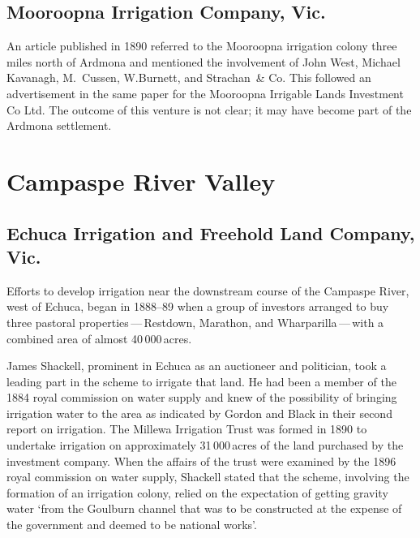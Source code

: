 \subsection*{Mooroopna Irrigation Company, Vic.}

An article published in 1890 referred to the Mooroopna irrigation
colony three miles north of Ardmona and mentioned the involvement of
John West, Mich\-ael Kavanagh, M.~Cussen, W.Burnett, and Strachan~\&
Co.  This followed an advertisement in the same paper for the
Mooroopna Irrigable Lands Investment Co Ltd. The outcome of this
venture is not clear; it may have become part of the Ardmona
settlement.

\section*{Campaspe River Valley}

\subsection*{Echuca Irrigation and Freehold Land Company, Vic.}

Efforts to develop irrigation near the downstream course of the
Campaspe River, west of Echuca, began in 1888--89 when a group of
investors arranged to buy three pastoral properties\,---\,Restdown,
Mara\-thon, and Wharparilla\,---\,with a combined area of almost
40\,000\,acres.

James Shackell, prominent in Echuca as an auctioneer and politician,
took a leading part in the scheme to irrigate that land.  He had been
a member of the 1884 royal commission on water supply and knew of the
possibility of bringing irrigation water to the area as indicated by
Gordon and Black in their second report on irrigation.  The Millewa
Irrigation Trust was formed in 1890 to undertake irrigation on
approximately 31\,000\,acres of the land purchased by the investment
company.  When the affairs of the trust were examined by the 1896
royal commission on water supply, Shackell stated that the scheme,
involving the formation of an irrigation colony, relied on the
expectation of getting gravity water `from the Goulburn channel that
was to be constructed at the expense of the government and deemed to
be national works'.

